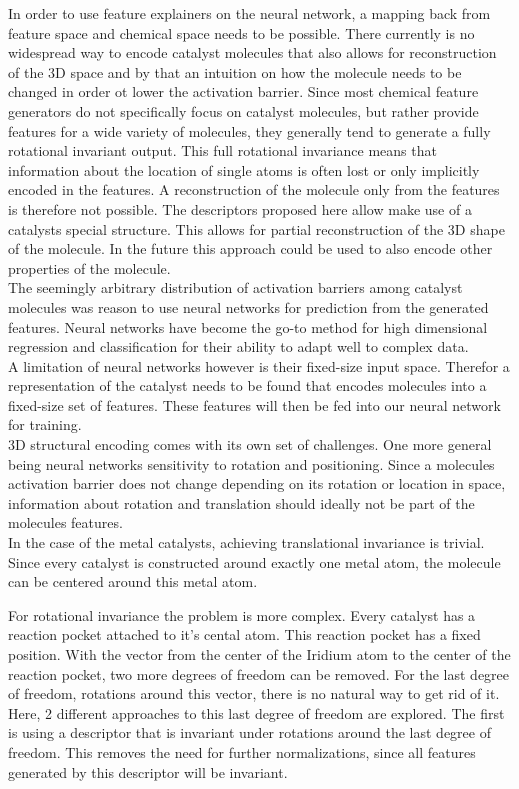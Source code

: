 In order to use feature explainers on the neural network, a mapping back from feature space and chemical space needs to be possible.
There currently is no widespread way to encode catalyst molecules that also allows for 
reconstruction of the 3D space and by that an intuition on how the molecule needs to be changed in order ot lower the activation barrier.
Since most chemical feature generators do not specifically focus on catalyst molecules,
but rather provide features for a wide variety of molecules, they generally tend to generate a fully rotational invariant output.
This full rotational invariance means that information about the location of single atoms is often lost or only implicitly encoded in the features.
A reconstruction of the molecule only from the features is therefore not possible.
The descriptors proposed here allow make use of a catalysts special structure.
This allows for partial reconstruction of the 3D shape of the molecule.
In the future this approach could be used to also encode other properties of the molecule.
\\

The seemingly arbitrary distribution of activation barriers among catalyst molecules  was reason to use neural networks for prediction from the generated features.
Neural networks have become the go-to method for high dimensional regression and classification for their ability to adapt well to complex data.
\\
A limitation of neural networks however is their fixed-size input space.
Therefor a representation of the catalyst needs to be found that encodes molecules into a fixed-size set of features.
These features will then be fed into our neural network for training. 
\\
3D structural encoding comes with its own set of challenges. 
One more general being neural networks sensitivity to rotation and positioning.
Since a molecules activation barrier does not change depending on its rotation or location in space, 
information about rotation and translation should ideally not be part of the molecules features.
\\
In the case of the metal catalysts, achieving translational invariance is trivial.
Since every catalyst is constructed around exactly one metal atom, the molecule can be centered around this metal atom.

For rotational invariance the problem is more complex.
Every catalyst has a reaction pocket attached to it's cental atom.
This reaction pocket has a fixed position.
With the vector from the center of the Iridium atom to the center of the reaction pocket, two more degrees of freedom can be removed.
For the last degree of freedom, rotations around this vector, there is no natural way to get rid of it.
Here, 2 different approaches to this last degree of freedom are explored.
The first is using a descriptor that is invariant under rotations around the last degree of freedom.
This removes the need for further normalizations, since all features generated by this descriptor will be invariant.

